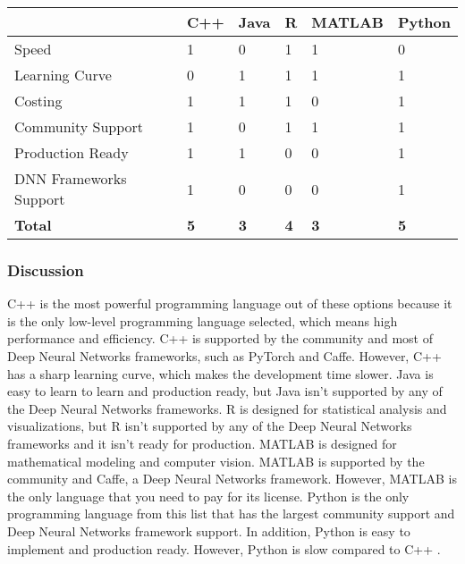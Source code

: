 \begin{center}
\begin{tabular}{|l|l|l|l|l|l|}
\hline
           & \textbf{C++} & \textbf{Java} & \textbf{R} & \textbf{MATLAB} & \textbf{Python}\\ \hline
Speed &     1      &      0     &      1     &      1     & 0          \\ \hline
Learning Curve &     0      &     1      &      1     &     1      &    1       \\ \hline
Costing &     1      &     1      &     1      &    0       &       1    \\ \hline
Community Support &      1     &     0      &   1        &      1     &     1      \\ \hline
Production Ready &     1      &     1      &    0       &       0    &      1     \\ \hline
DNN Frameworks Support &     1      &      0     &     0      &        0   &   1        \\ \hline
\textbf{Total} &      \textbf{5}     &   \textbf{3}        &      \textbf{4}     &     \textbf{3}      &    \textbf{5}       \\ \hline
\end{tabular}
\end{center}

\subsubsection{Discussion}

C++ is the most powerful programming language out of these options because it is the only low-level programming language selected, which means high performance and efficiency. C++ is supported by the community and most of Deep Neural Networks frameworks, such as PyTorch and Caffe. However, C++ has a sharp learning curve, which makes the development time slower. Java is easy to learn to learn and production ready, but Java isn't supported by any of the Deep Neural Networks frameworks. R is designed for statistical analysis and visualizations, but R isn't supported by any of the Deep Neural Networks frameworks and it isn't ready for production. MATLAB is designed for mathematical modeling and computer vision. MATLAB is supported by the community and Caffe, a Deep Neural Networks framework. However, MATLAB is the only language that you need to pay for its license. Python is the only programming language from this list that has the largest community support and Deep Neural Networks framework support. In addition, Python is easy to implement and production ready. However, Python is slow compared to C++ \cite{pl2}\cite{pl3}.


